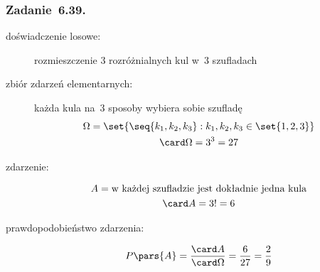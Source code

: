 \subsubsection*{Zadanie~6.39.}
\begin{description}
    \item[doświadczenie losowe:] rozmieszczenie \(3\) rozróżnialnych kul w~\(3\) szufladach
    \item[zbiór zdarzeń elementarnych:] każda kula na~\(3\) sposoby wybiera sobie szufladę
        \begin{gather*}
            \Omega = \set{\seq{k_1, k_2, k_3} : k_1, k_2, k_3 \in \set{1, 2, 3}}\\
            \card\Omega = 3^3 = 27
        \end{gather*}
    \item[zdarzenie:]
        \begin{gather*}
            A = \text{w~każdej szufladzie jest dokładnie jedna kula}\\
            \card A = 3! = 6
        \end{gather*}
    \item[prawdopodobieństwo zdarzenia:]
        \begin{equation*}
            P\pars{A}
                = \frac{\card A}{\card\Omega}
                = \frac{6}{27}
                = \frac{2}{9}
        \end{equation*}
\end{description}
